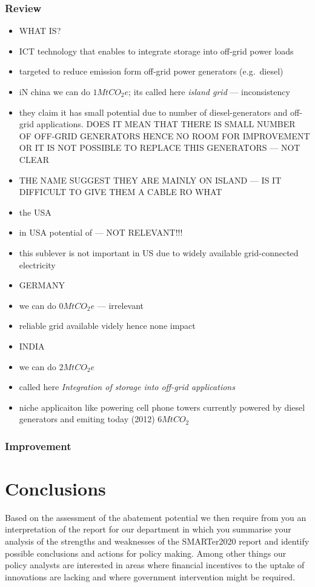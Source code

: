 \documentclass[11pt, twocolumn]{article}
\begin{document}
\subsubsection{Review}
\begin{itemize}
\item WHAT IS?
\item ICT technology that enables to integrate storage into off-grid power loads
\item targeted to reduce emission form off-grid power generators (e.g.\ diesel)


\item iN china we can do $1 Mt CO_2e$; its called here \emph{island grid} --- inconsistency
\item they claim it has small potential due to number of diesel-generators and off-grid applications. DOES IT MEAN THAT THERE IS SMALL NUMBER OF OFF-GRID GENERATORS HENCE NO ROOM FOR IMPROVEMENT OR IT IS NOT POSSIBLE TO REPLACE THIS GENERATORS --- NOT CLEAR
\item THE NAME SUGGEST THEY ARE MAINLY ON ISLAND --- IS IT DIFFICULT TO GIVE THEM A CABLE RO WHAT

\item the USA
\item in USA potential of --- NOT RELEVANT!!!
\item this sublever is not important in US due to widely available grid-connected electricity

\item GERMANY
\item we can do $0 Mt CO_2e$ --- irrelevant
\item reliable grid available videly hence none impact


\item INDIA
\item we can do $2 Mt CO_2e$
\item called here \emph{Integration of storage into off-grid applications}
\item niche applicaiton like powering cell phone towers currently powered by diesel generators and emiting today (2012) $6 MtCO_2$

\end{itemize}
\subsubsection{Improvement}

\section{Conclusions}
Based on the assessment of the abatement potential we then require from you an interpretation of the report for our department in which you summarise your analysis of the strengths and weaknesses of the SMARTer2020 report and identify possible conclusions and actions for policy making. Among other things our policy analysts are interested in areas where financial incentives to the uptake of innovations are lacking and where government intervention might be required.\\
\end{document}
